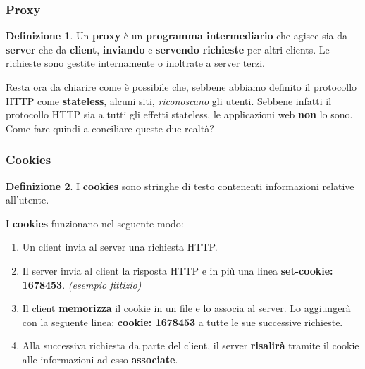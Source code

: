 \documentclass[11pt,a4paper,oneside]{book}
\theoremstyle{definition}
\newtheorem{definition}{Definizione}[section]
\begin{document}
\subsubsection{Proxy}
\theoremstyle{definition}
\begin{definition}
	Un \textbf{proxy} è un \textbf{programma intermediario} che agisce sia da \textbf{server} che da \textbf{client}, \textbf{inviando} e \textbf{servendo} \textbf{richieste} per altri clients. Le richieste sono gestite internamente o inoltrate a server terzi.
\end{definition}
Resta ora da chiarire come è possibile che, sebbene abbiamo definito il protocollo HTTP come \textbf{stateless}, alcuni siti, \textit{riconoscano} gli utenti.
Sebbene infatti il protocollo HTTP sia a tutti gli effetti stateless, le applicazioni web \textbf{non} lo sono. Come fare quindi a conciliare queste due realtà?
\subsubsection{Cookies}
\begin{definition}
	I \textbf{cookies} sono stringhe di testo contenenti informazioni relative all'utente.
\end{definition}
I \textbf{cookies} funzionano nel seguente modo:
\begin{enumerate}
	\item Un client invia al server una richiesta HTTP.
	\item Il server invia al client la risposta HTTP e in più una linea \textbf{set-cookie: 1678453}. \textit{(esempio fittizio)}
	\item Il client \textbf{memorizza} il cookie in un file e lo associa al server.
	      Lo aggiungerà con la seguente linea: \textbf{cookie: 1678453} a tutte le sue successive richieste.
	\item Alla successiva richiesta da parte del client, il server \textbf{risalirà} tramite il cookie alle informazioni ad esso \textbf{associate}.
\end{enumerate}

\pagebreak
\end{document}
